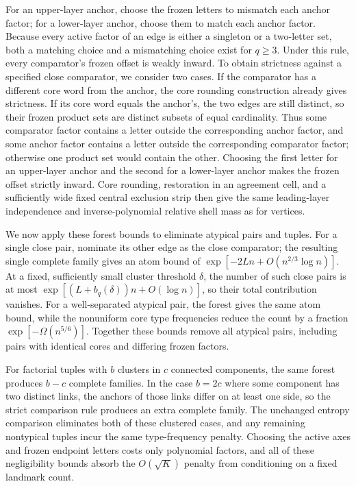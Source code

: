 For an upper-layer anchor, choose the frozen letters to mismatch each anchor factor; for a lower-layer anchor, choose them to match each anchor factor. Because every active factor of an edge is either a singleton or a two-letter set, both a matching choice and a mismatching choice exist for \(q\ge3\). Under this rule, every comparator's frozen offset is weakly inward. To obtain strictness against a specified close comparator, we consider two cases. If the comparator has a different core word from the anchor, the core rounding construction already gives strictness. If its core word equals the anchor's, the two edges are still distinct, so their frozen product sets are distinct subsets of equal cardinality. Thus some comparator factor contains a letter outside the corresponding anchor factor, and some anchor factor contains a letter outside the corresponding comparator factor; otherwise one product set would contain the other. Choosing the first letter for an upper-layer anchor and the second for a lower-layer anchor makes the frozen offset strictly inward. Core rounding, restoration in an agreement cell, and a sufficiently wide fixed central exclusion strip then give the same leading-layer independence and inverse-polynomial relative shell mass as for vertices.

We now apply these forest bounds to eliminate atypical pairs and tuples. For a single close pair, nominate its other edge as the close comparator; the resulting single complete family gives an atom bound of \(\exp[-2Ln+O(n^{2/3}\log n)]\). At a fixed, sufficiently small cluster threshold \(\delta\), the number of such close pairs is at most \(\exp[(L+b_q(\delta))n+O(\log n)]\), so their total contribution vanishes. For a well-separated atypical pair, the forest gives the same atom bound, while the nonuniform core type frequencies reduce the count by a fraction \(\exp[-\Omega(n^{5/6})]\). Together these bounds remove all atypical pairs, including pairs with identical cores and differing frozen factors.

For factorial tuples with \(b\) clusters in \(c\) connected components, the same forest produces \(b-c\) complete families. In the case \(b=2c\) where some component has two distinct links, the anchors of those links differ on at least one side, so the strict comparison rule produces an extra complete family. The unchanged entropy comparison eliminates both of these clustered cases, and any remaining nontypical tuples incur the same type-frequency penalty. Choosing the active axes and frozen endpoint letters costs only polynomial factors, and all of these negligibility bounds absorb the \(O(\sqrt K)\) penalty from conditioning on a fixed landmark count.

